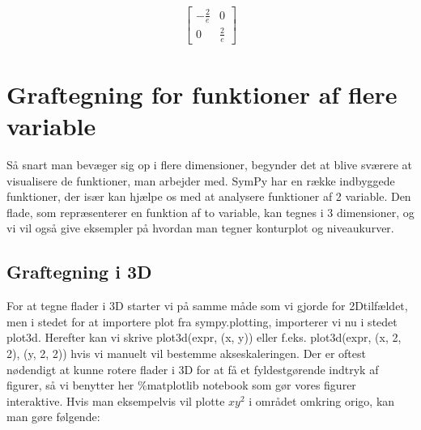 \documentclass[letterpaper,10pt,english]{jupyterBook}
\begin{document}
\begin{sphinxVerbatim}[commandchars=\\\{\}]
  
\end{sphinxVerbatim}
\begin{equation*}
\begin{split}\displaystyle \left[\begin{matrix}- \frac{2}{e} & 0\\0 & \frac{2}{e}\end{matrix}\right]\end{split}
\end{equation*}

\section{Graftegning for funktioner af flere variable}
\label{\detokenize{notebooks/sympy/Notebook_FlereVar_plot:graftegning-for-funktioner-af-flere-variable}}\label{\detokenize{notebooks/sympy/Notebook_FlereVar_plot::doc}}
Så snart man bevæger sig op i flere dimensioner, begynder det at blive sværere at visualisere de funktioner, man arbejder med. SymPy har en række indbyggede funktioner, der især kan hjælpe os med at analysere funktioner af 2 variable. Den flade, som repræsenterer en funktion af to variable, kan tegnes i 3 dimensioner, og vi vil også give eksempler på hvordan man tegner konturplot og niveaukurver.


\begin{sphinxVerbatim}[commandchars=\\\{\}]
    
    
\end{sphinxVerbatim}


\subsection{Graftegning i 3D}
\label{\detokenize{notebooks/sympy/Notebook_FlereVar_plot:graftegning-i-3d}}
For at tegne flader i 3D starter vi på samme måde som vi gjorde for 2D\sphinxhyphen{}tilfældet, men i stedet for at importere plot fra sympy.plotting, importerer vi nu i stedet plot3d. Herefter kan vi skrive plot3d(expr, (x, y)) eller f.eks. plot3d(expr, (x, \sphinxhyphen{}2, 2), (y, \sphinxhyphen{}2, 2)) hvis vi manuelt vil bestemme akseskaleringen. Der er oftest nødendigt at kunne rotere flader i 3D for at få et fyldestgørende indtryk af figurer, så vi benytter her \%matplotlib notebook som gør vores figurer interaktive. Hvis man eksempelvis vil plotte \(xy^2\) i området omkring origo, kan man gøre følgende:
\end{document}
